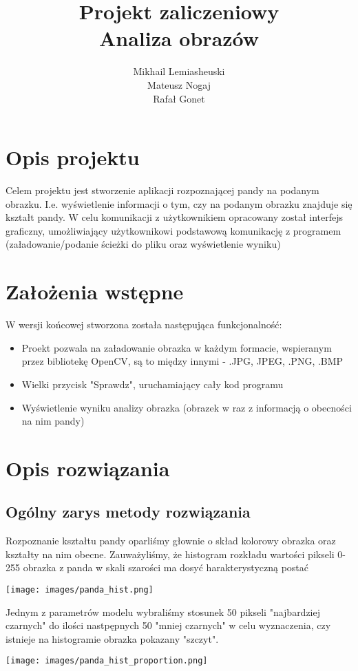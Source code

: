 \documentclass[polish,12pt]{article}
\title{Projekt zaliczeniowy\\Analiza obrazów}
\author{Mikhail Lemiasheuski\\Mateusz Nogaj\\Rafał Gonet}
\begin{document}
\maketitle


\section{Opis projektu}
Celem projektu jest stworzenie aplikacji rozpoznającej pandy na podanym obrazku. I.e. wyświetlenie informacji o tym, czy na podanym obrazku znajduje się kształt pandy. W celu komunikacji z użytkownikiem opracowany został interfejs graficzny, umożliwiający użytkownikowi podstawową komunikację z programem (załadowanie/podanie ścieżki do pliku oraz wyświetlenie wyniku)

\section{Założenia wstępne}
W wersji końcowej stworzona została następująca funkcjonalność:
\begin{itemize}
    \item Proekt pozwala na załadowanie obrazka w każdym formacie, wspieranym przez bibliotekę OpenCV, są to między innymi - .JPG, JPEG, .PNG, .BMP
    \item Wielki przycisk "Sprawdz", uruchamiający cały kod programu
    \item Wyświetlenie wyniku analizy obrazka (obrazek w raz z informacją o obecności na nim pandy)
\end{itemize}

\pagebreak
\section{Opis rozwiązania}

\subsection{Ogólny zarys metody rozwiązania}
Rozpoznanie kształtu pandy oparliśmy głownie o skład kolorowy obrazka oraz kształty na nim obecne. Zauważyliśmy, że histogram rozkładu wartości pikseli 0-255 obrazka z panda w skali szarości ma dosyć harakterystyczną postać 
\begin{center}
    \texttt{[image: images/panda\_hist.png]}
\end{center}
Jednym z parametrów modelu wybraliśmy stosunek 50 pikseli "najbardziej czarnych" do ilości nastpępnych 50 "mniej czarnych" w celu wyznaczenia, czy istnieje na histogramie obrazka pokazany "szczyt".
\begin{center}
    \texttt{[image: images/panda\_hist\_proportion.png]}
\end{center}
\end{document}
